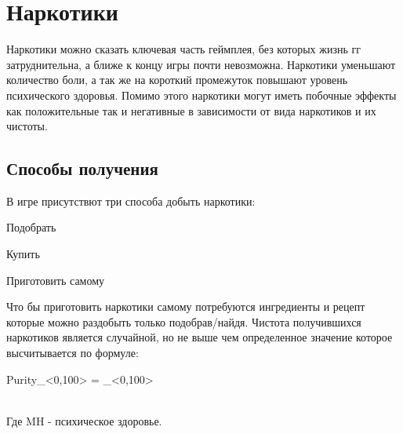 \documentclass[11pt]{report}
\newenvironment{enumerate*}%
  {\begin{enumerate}%
    \setlength{\itemsep}{2pt}%
    \setlength{\parskip}{0.75pt}}%
  {\end{enumerate}}
\begin{document}
\section{Наркотики}
Наркотики можно сказать ключевая часть геймплея, без которых жизнь гг затруднительна, а ближе к концу игры почти невозможна. Наркотики уменьшают количество боли, а так же на короткий промежуток повышают уровень психического здоровья. Помимо этого наркотики могут иметь побочные эффекты как положительные так и негативные в зависимости от вида наркотиков и их чистоты. 
\subsection{Способы получения}
В игре присутствют три способа добыть наркотики:
\begin{enumerate*}
\item Подобрать
\item Купить
\item Приготовить самому
\end{enumerate*}
Что бы приготовить наркотики самому потребуются ингредиенты и рецепт которые можно раздобыть только подобрав/найдя. Чистота получившихся наркотиков является случайной, но не выше чем определенное значение которое высчитывается по формуле: 

\begin{myequation}
		{Purity}_{<0,100>} =  _{<0,100>}
\end{myequation}\\
Где MH - психическое здоровье.
\end{document}

